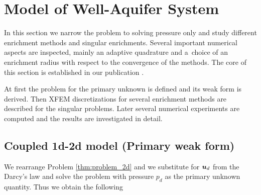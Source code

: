 \section{Model of Well-Aquifer System} 
\label{sec:model_aquifer}
In this section we narrow the problem to solving pressure only and study different enrichment methods and singular enrichments.
Several important numerical aspects are inspected, mainly an adaptive quadrature and
a~choice of an enrichment radius with respect to the convergence of the methods.
The core of this section is established in our publication \cite{exner_2016}.

At first the problem for the primary unknown is defined and its weak form is derived. Then
XFEM discretizations for several enrichment methods are described for the singular problems.
Later several numerical experiments are computed and the results are investigated in detail.


\subsection{Coupled 1d-2d model (Primary weak form)}

We rearrange Problem \ref{thm:problem_2d} and we substitute for $\mathbf{\boldsymbol{u}}_d$ from the Darcy's law and solve the problem
with pressure $p_d$ as the primary unknown quantity. Thus we obtain the following


